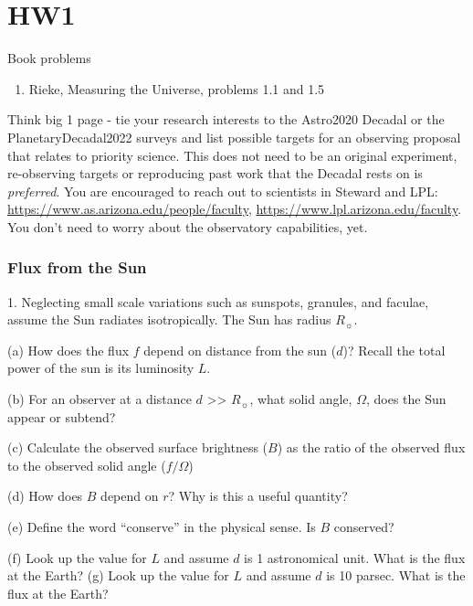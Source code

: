\section{HW1}
\begin{frame}{Book problems}
\begin{enumerate}
    \item Rieke, Measuring the Universe, problems 1.1 and 1.5
\end{enumerate}
\end{frame}

\begin{frame}{Think big}
    1 page - tie your research interests to the Astro2020 Decadal or the PlanetaryDecadal2022 surveys and list possible targets for an observing proposal that relates to priority science. 
    This does not need to be an original experiment, re-observing targets or reproducing past work that the Decadal rests on is \textit{preferred}.
    You are encouraged to reach out to scientists in Steward and LPL: \url{https://www.as.arizona.edu/people/faculty}, \url{https://www.lpl.arizona.edu/faculty}.
    You don't need to worry about the observatory capabilities, yet.
\end{frame}

\begin{frame}
  \frametitle{Flux from the Sun}

1.  Neglecting small scale variations such as sunspots, granules, and faculae, assume the Sun radiates isotropically. The Sun has radius $R_\sun$.
 
(a)      How does the flux $f$ depend on distance from the sun ($d$)? Recall the total power of the sun is its luminosity $L$.

(b)       For an observer at a distance $d$ >> $R_\sun$, what solid angle, $\Omega$, does the Sun 
appear or subtend?  
 
(c)     Calculate the observed surface brightness ($B$) as the ratio of the observed flux to the observed solid angle ($f/\Omega$)
 
(d)      How does $B$ depend on $r$? Why is this a useful quantity? 

(e) Define the word ``conserve'' in the physical sense. Is $B$ conserved?

(f) Look up the value for $L$ and assume $d$ is 1 astronomical unit. What is the flux at the Earth? 
(g) Look up the value for $L$ and assume $d$ is 10 parsec. What is the flux at the Earth? 
\end{frame}
